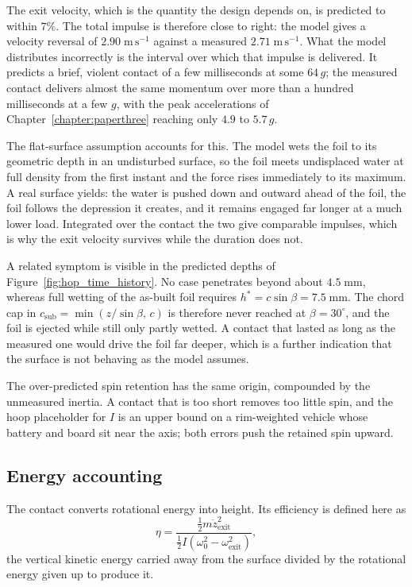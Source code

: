 The exit velocity, which is the quantity the design depends on, is predicted to
within $7\%$.  The total impulse is therefore close to right: the model gives a
velocity reversal of $2.90\;\mathrm{m\,s^{-1}}$ against a measured
$2.71\;\mathrm{m\,s^{-1}}$.  What the model distributes incorrectly is the
interval over which that impulse is delivered.  It predicts a brief, violent
contact of a few milliseconds at some $64\,g$; the measured contact delivers
almost the same momentum over more than a hundred milliseconds at a few $g$,
with the peak accelerations of
Chapter~\ref{chapter:paperthree} reaching only $4.9$ to $5.7\,g$.

The flat-surface assumption accounts for this.  The model wets the foil to its
geometric depth in an undisturbed surface, so the foil meets undisplaced water
at full density from the first instant and the force rises immediately to its
maximum.  A real surface yields: the water is pushed down and outward ahead of
the foil, the foil follows the depression it creates, and it remains engaged
far longer at a much lower load.  Integrated over the contact the two give
comparable impulses, which is why the exit velocity survives while the duration
does not.

A related symptom is visible in the predicted depths of
Figure~\ref{fig:hop_time_history}.  No case penetrates beyond about
$4.5\;\mathrm{mm}$, whereas full wetting of the as-built foil requires
$h^{*} = c\sin\beta = 7.5\;\mathrm{mm}$.  The chord cap in
$c_{\mathrm{sub}} = \min(z/\sin\beta,\,c)$ is therefore never reached at
$\beta = 30^{\circ}$, and the foil is ejected while still only partly wetted.
A contact that lasted as long as the measured one would drive the foil far
deeper, which is a further indication that the surface is not behaving as the
model assumes.

The over-predicted spin retention has the same origin, compounded by the
unmeasured inertia.  A contact that is too short removes too little spin,
and the hoop placeholder for $I$ is an upper bound on a rim-weighted vehicle
whose battery and board sit near the axis; both errors push the retained spin
upward.

\subsection{Energy accounting}
\label{sec:energy_accounting}

The contact converts rotational energy into height.  Its efficiency is defined
here as
%
\begin{equation}
    \eta = \frac{\tfrac{1}{2} m \dot{z}_{\mathrm{exit}}^{2}}
                {\tfrac{1}{2} I \left(\omega_0^{2} - \omega_{\mathrm{exit}}^{2}\right)},
    \label{eq:hop_efficiency}
\end{equation}
%
the vertical kinetic energy carried away from the surface divided by the
rotational energy given up to produce it.

